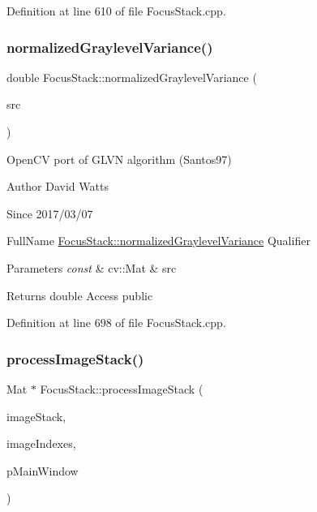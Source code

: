 Definition at line 610 of file Focus\+Stack.\+cpp.

\mbox{\label{class_focus_stack_ad1ceb7d7b721e11b2861332823c0b09d}} 
\subsubsection{\texorpdfstring{normalized\+Graylevel\+Variance()}{normalizedGraylevelVariance()}}
{\footnotesize\ttfamily double Focus\+Stack\+::normalized\+Graylevel\+Variance (\begin{DoxyParamCaption}\item[{const cv\+::\+Mat \&}]{src }\end{DoxyParamCaption})\hspace{0.3cm}{\ttfamily [static]}}

Open\+CV port of \textquotesingle{}G\+L\+VN\textquotesingle{} algorithm (Santos97)

\begin{DoxyAuthor}{Author}
David Watts 
\end{DoxyAuthor}
\begin{DoxySince}{Since}
2017/03/07
\end{DoxySince}
Full\+Name \hyperlink{class_focus_stack_ad1ceb7d7b721e11b2861332823c0b09d}{Focus\+Stack\+::normalized\+Graylevel\+Variance} Qualifier 
\begin{DoxyParams}{Parameters}
{\em const} & cv\+::\+Mat \& src \\
\hline
\end{DoxyParams}
\begin{DoxyReturn}{Returns}
double Access public 
\end{DoxyReturn}


Definition at line 698 of file Focus\+Stack.\+cpp.

\mbox{\label{class_focus_stack_aca40f92aa05f5aa0a2e58c846bb69a75}} 
\subsubsection{\texorpdfstring{process\+Image\+Stack()}{processImageStack()}}
{\footnotesize\ttfamily Mat $\ast$ Focus\+Stack\+::process\+Image\+Stack (\begin{DoxyParamCaption}\item[{std\+::vector$<$ \hyperlink{classtargeter_image}{targeter\+Image} $>$ \&}]{image\+Stack,  }\item[{std\+::vector$<$ int $>$ \&}]{image\+Indexes,  }\item[{\hyperlink{class_main_window}{Main\+Window} $\ast$}]{p\+Main\+Window }\end{DoxyParamCaption})\hspace{0.3cm}{\ttfamily [static]}}

